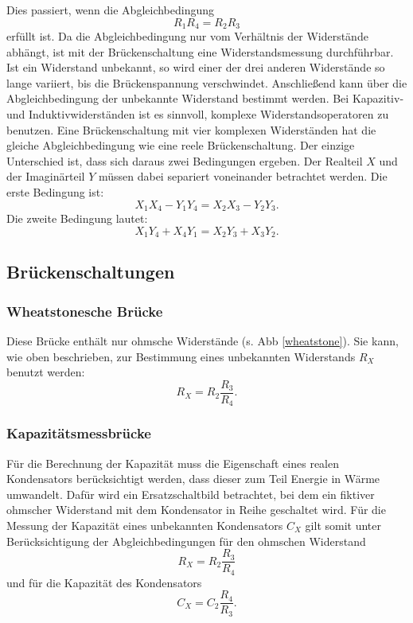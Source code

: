 Dies passiert, wenn die Abgleichbedingung
\begin{equation*}
    R_1 R_4 = R_2 R_3
\end{equation*}
erfüllt ist.
Da die Abgleichbedingung nur vom Verhältnis der Widerstände abhängt, 
ist mit der Brückenschaltung eine Widerstandsmessung durchführbar. 
Ist ein Widerstand unbekannt, so wird einer der drei anderen Widerstände so lange variiert, bis die Brückenspannung verschwindet. 
Anschließend kann über die Abgleichbedingung der unbekannte Widerstand bestimmt werden. 
\newline
Bei Kapazitiv- und Induktivwiderständen ist es sinnvoll, komplexe Widerstandsoperatoren zu benutzen. %
Eine Brückenschaltung mit vier komplexen Widerständen hat die gleiche Abgleichbedingung wie eine reele Brückenschaltung. 
Der einzige Unterschied ist, dass sich daraus zwei Bedingungen ergeben. 
Der Realteil $X$ und der Imaginärteil $Y$ müssen dabei separiert voneinander betrachtet werden. 
Die erste Bedingung ist:
\begin{equation*}
    X_1X_4 - Y_1Y_4 = X_2X_3 - Y_2Y_3.
\end{equation*}
Die zweite Bedingung lautet: 
\begin{equation*}
    X_1Y_4 + X_4Y_1 = X_2Y_3 + X_3Y_2.
\end{equation*}

\subsection{Brückenschaltungen}
\subsubsection{Wheatstonesche Brücke}
Diese Brücke enthält nur ohmsche Widerstände (s. Abb \ref{wheatstone}). Sie kann, wie oben beschrieben, zur Bestimmung eines unbekannten Widerstands $R_X$ benutzt werden:
\begin{equation}
    R_X = R_2 \frac{R_3}{R_4}.
    \label{eqn:a_r}
\end{equation}

\subsubsection{Kapazitätsmessbrücke}
Für die Berechnung der Kapazität muss die Eigenschaft eines realen Kondensators berücksichtigt werden, dass dieser zum Teil Energie in Wärme umwandelt. %
Dafür wird ein Ersatzschaltbild betrachtet, bei dem ein fiktiver ohmscher Widerstand mit dem Kondensator in Reihe geschaltet wird. 
Für die Messung der Kapazität eines unbekannten Kondensators $C_X$ gilt somit unter Berücksichtigung der Abgleichbedingungen für den ohmschen 
Widerstand 
\begin{equation}
    R_X = R_2 \frac{R_3}{R_4}
    \label{eqn:b_r}
\end{equation}
und für die Kapazität des Kondensators 
\begin{equation}
    C_X = C_2 \frac{R_4}{R_3}.
    \label{eqn:b_c}
\end{equation}


